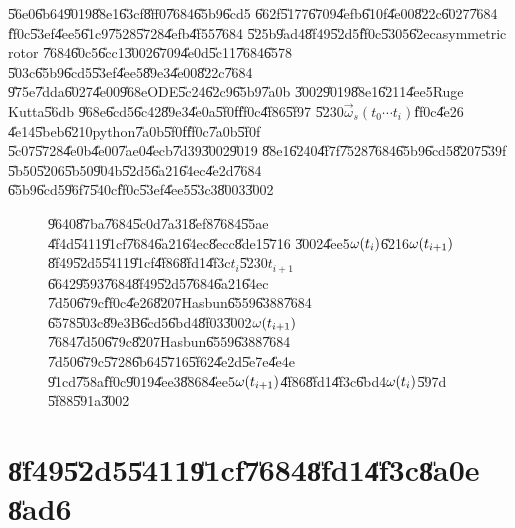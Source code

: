 \documentclass[12pt,a4paper]{article}
\begin{document}
\U{56e0}\U{6b64}\U{9019}\U{88e1}\U{63cf}\U{8ff0}\U{7684}\U{65b9}\U{6cd5}%
\U{662f}\U{5177}\U{6709}\U{4efb}\U{610f}\U{4e00}\U{822c}\U{6027}\U{7684}%
\U{ff0c}\U{53ef}\U{4ee5}\U{61c9}\U{7528}\U{5728}\U{4efb}\U{4f55}\U{7684}%
\U{525b}\U{9ad4}\U{8f49}\U{52d5}\U{ff0c}\U{5305}\U{62ec}asymmetric rotor%
\U{7684}\U{60c5}\U{6cc1}\U{3002}\U{6709}\U{4e0d}\U{5c11}\U{7684}\U{6578}%
\U{503c}\U{65b9}\U{6cd5}\U{53ef}\U{4ee5}\U{89e3}\U{4e00}\U{822c}\U{7684}%
\U{975e}\U{7dda}\U{6027}\U{4e00}\U{968e}ODE\U{5c24}\U{62c9}\U{65b9}\U{7a0b}%
\cite{matlab}\U{3002}\U{9019}\U{88e1}\U{6211}\U{4ee5}Ruge Kutta\U{56db}%
\U{968e}\U{6cd5}\U{6c42}\U{89e3}\U{4e0a}\U{5f0f}\U{ff0c}\U{4f86}\U{5f97}%
\U{5230}$\vec{\omega}_{s}\left( t_{0}\cdots t_{i}\right) $\U{ff0c}\U{4e26}%
\U{4e14}\U{5beb}\U{6210}python\U{7a0b}\U{5f0f}\U{ff0c}\U{7a0b}\U{5f0f}%
\U{5c07}\U{5728}\U{4e0b}\U{4e00}\U{7ae0}\U{4ecb}\U{7d39}\U{3002}\U{9019}%
\U{88e1}\U{6240}\U{4f7f}\U{7528}\U{7684}\U{65b9}\U{6cd5}\U{8207}\U{539f}%
\U{5b50}\U{5206}\U{5b50}\U{904b}\U{52d5}\U{6a21}\U{64ec}\U{4e2d}\U{7684}%
\U{65b9}\U{6cd5}\U{96f7}\U{540c}\U{ff0c}\U{53ef}\U{4ee5}\U{53c3}\U{8003}\cite%
{rapaport}\U{3002}

\begin{figure}[th]
\caption{\U{9640}\U{87ba}\U{7684}\U{5c0d}\U{7a31}\U{8ef8}\U{7684}\U{55ae}%
\U{4f4d}\U{5411}\U{91cf}\U{7684}\U{6a21}\U{64ec}\U{8ecc}\U{8de1}\U{5716}%
\U{3002}\U{4ee5}$\protect\omega (t_{i})$\U{6216}$\protect\omega (t_{i+1})$%
\U{8f49}\U{52d5}\U{5411}\U{91cf}\U{4f86}\U{8fd1}\U{4f3c}$t_{i}$\U{5230}$%
t_{i+1}$\U{6642}\U{9593}\U{7684}\U{8f49}\U{52d5}\U{7684}\U{6a21}\U{64ec}%
\U{7d50}\U{679c}\U{ff0c}\U{4e26}\U{8207}Hasbun\U{6559}\U{6388}\U{7684}%
\U{6578}\U{503c}\U{89e3}B\U{6cd5}\U{6bd4}\U{8f03}\U{3002}$\protect\omega %
(t_{i+1})$\U{7684}\U{7d50}\U{679c}\U{8207}Hasbun\U{6559}\U{6388}\U{7684}%
\U{7d50}\U{679c}\U{5728}\U{6b64}\U{5716}\U{5f62}\U{4e2d}\U{5e7e}\U{4e4e}%
\U{91cd}\U{758a}\U{ff0c}\U{9019}\U{4ee3}\U{8868}\U{4ee5}$\protect\omega %
(t_{i+1})$\U{4f86}\U{8fd1}\U{4f3c}\U{6bd4}$\protect\omega (t_{i})$\U{597d}%
\U{5f88}\U{591a}\U{3002}}
\label{wtiwti1}
\begin{center}
\fbox{}
\end{center}
\end{figure}

\section{\U{8f49}\U{52d5}\U{5411}\U{91cf}\U{7684}\U{8fd1}\U{4f3c}\U{8a0e}%
\U{8ad6}}
\end{document}
